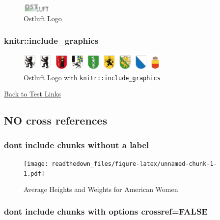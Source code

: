 \documentclass[
]{article}
\begin{document}
\begin{figure}
\hypertarget{fig:ostluft-logo}{%
\centering
\includegraphics[width=0.54167in,height=\textheight]{ostluft-logo.png}
\caption{Ostluft Logo}\label{fig:ostluft-logo}
}
\end{figure}

\hypertarget{knitrinclude_graphics}{%
\subsubsection{knitr::include\_graphics}\label{knitrinclude_graphics}}

\begin{figure}
\hypertarget{fig:knitr-include-graphics}{%
\centering
\includegraphics[width=2.90625in,height=\textheight]{ostluft-wappen.png}
\caption{Ostluft Logo with
\texttt{knitr::include\_graphics}}\label{fig:knitr-include-graphics}
}
\end{figure}

\protect\hyperlink{sec:test}{Back to Test Links}

\hypertarget{no-cross-references}{%
\subsection{NO cross references}\label{no-cross-references}}

\hypertarget{dont-include-chunks-without-a-label}{%
\subsubsection{dont include chunks without a
label}\label{dont-include-chunks-without-a-label}}

\begin{figure}
\centering
\texttt{[image: readthedown\_files/figure-latex/unnamed-chunk-1-1.pdf]}
\caption{Average Heights and Weights for American Women}
\end{figure}

\hypertarget{dont-include-chunks-with-options-crossreffalse}{%
\subsubsection{dont include chunks with options
crossref=FALSE}\label{dont-include-chunks-with-options-crossreffalse}}
\end{document}
